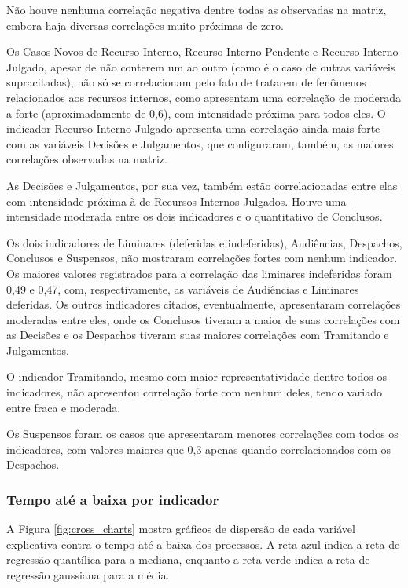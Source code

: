 Não houve nenhuma correlação negativa dentre todas as observadas na matriz, embora haja diversas correlações muito próximas de zero.

Os Casos Novos de Recurso Interno, Recurso Interno Pendente e Recurso Interno Julgado, apesar de não conterem um ao outro (como é o caso de outras variáveis supracitadas), não só se correlacionam pelo fato de tratarem de fenômenos relacionados aos recursos internos, como apresentam uma correlação de moderada a forte (aproximadamente de 0,6), com intensidade próxima para todos eles. O indicador Recurso Interno Julgado apresenta uma correlação ainda mais forte com as variáveis Decisões e Julgamentos, que configuraram, também, as maiores correlações observadas na matriz.

As Decisões e Julgamentos, por sua vez, também estão correlacionadas entre elas com intensidade próxima à de Recursos Internos Julgados. Houve uma intensidade moderada entre os dois indicadores e o quantitativo de Conclusos.

Os dois indicadores de Liminares (deferidas e indeferidas), Audiências, Despachos, Conclusos e Suspensos, não mostraram correlações fortes com nenhum indicador. Os maiores valores registrados para a correlação das liminares indeferidas foram 0,49 e 0,47, com, respectivamente, as variáveis de Audiências e Liminares deferidas. Os outros indicadores citados, eventualmente, apresentaram correlações moderadas entre eles, onde os Conclusos tiveram a maior de suas correlações com as Decisões e os Despachos tiveram suas maiores correlações com Tramitando e Julgamentos.

O indicador Tramitando, mesmo com maior representatividade dentre todos os indicadores, não apresentou correlação forte com nenhum deles, tendo variado entre fraca e moderada.

Os Suspensos foram os casos que apresentaram menores correlações com todos os indicadores, com valores maiores que 0,3 apenas quando correlacionados com os Despachos.

\subsubsection{Tempo até a baixa por indicador}

A Figura \ref{fig:cross_charts} mostra gráficos de dispersão de cada variável explicativa contra o tempo até a baixa dos processos. A reta azul indica a reta de regressão quantílica para a mediana, enquanto a reta verde indica a reta de regressão gaussiana para a média.

